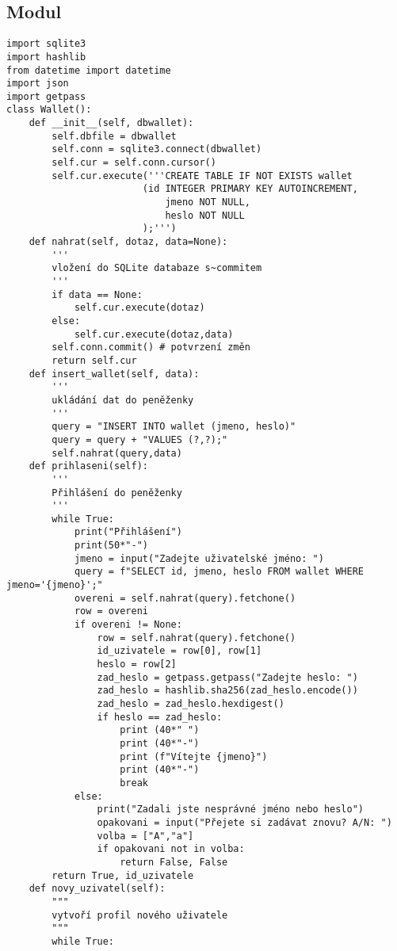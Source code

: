 \documentclass[12pt]{report}			%
\begin{document}
{\begin{appendices}
	\chapter{Modul}
	\begin{lstlisting}
import sqlite3
import hashlib
from datetime import datetime
import json
import getpass
class Wallet():
    def __init__(self, dbwallet):
        self.dbfile = dbwallet
        self.conn = sqlite3.connect(dbwallet)
        self.cur = self.conn.cursor()
        self.cur.execute('''CREATE TABLE IF NOT EXISTS wallet
                        (id INTEGER PRIMARY KEY AUTOINCREMENT,
                            jmeno NOT NULL,
                            heslo NOT NULL
                        );''')
    def nahrat(self, dotaz, data=None):
        '''
        vložení do SQLite databaze s~commitem
        '''    
        if data == None:
            self.cur.execute(dotaz)
        else:
            self.cur.execute(dotaz,data)
        self.conn.commit() # potvrzení změn
        return self.cur
    def insert_wallet(self, data):
        '''
        ukládání dat do peněženky
        '''    
        query = "INSERT INTO wallet (jmeno, heslo)"
        query = query + "VALUES (?,?);"
        self.nahrat(query,data)
    def prihlaseni(self): 
        '''
        Přihlášení do peněženky
        '''
        while True:
            print("Přihlášení")   
            print(50*"-") 
            jmeno = input("Zadejte uživatelské jméno: ")
            query = f"SELECT id, jmeno, heslo FROM wallet WHERE jmeno='{jmeno}';"
            overeni = self.nahrat(query).fetchone()
            row = overeni
            if overeni != None:
                row = self.nahrat(query).fetchone()
                id_uzivatele = row[0], row[1]
                heslo = row[2]
                zad_heslo = getpass.getpass("Zadejte heslo: ")
                zad_heslo = hashlib.sha256(zad_heslo.encode())
                zad_heslo = zad_heslo.hexdigest()
                if heslo == zad_heslo:
                    print (40*" ")
                    print (40*"-")
                    print (f"Vítejte {jmeno}")
                    print (40*"-")
                    break
            else:
                print("Zadali jste nesprávné jméno nebo heslo")
                opakovani = input("Přejete si zadávat znovu? A/N: ")
                volba = ["A","a"]
                if opakovani not in volba:
                    return False, False
        return True, id_uzivatele
    def novy_uzivatel(self):
        """
        vytvoří profil nového uživatele
        """
        while True:

\end{lstlisting}
\end{appendices}}
\end{document}

